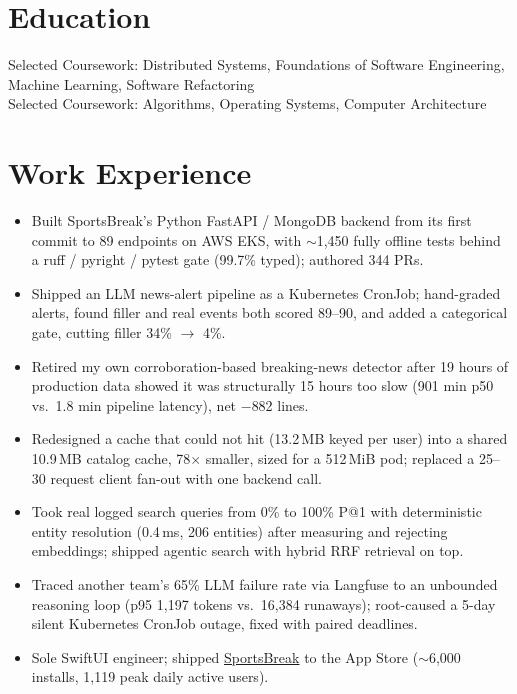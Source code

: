 \documentclass[11pt, letterpaper]{article}
\begin{document}

\section{Education}
Selected Coursework: Distributed Systems, Foundations of Software Engineering, Machine Learning, Software Refactoring\\[1pt]
Selected Coursework: Algorithms, Operating Systems, Computer Architecture

\section{Work Experience}
\begin{itemize}
  \item Built SportsBreak's Python FastAPI / MongoDB backend from its first commit to 89 endpoints on AWS EKS, with $\sim$1{,}450 fully offline tests behind a ruff / pyright / pytest gate (99.7\% typed); authored 344 PRs.
  \item Shipped an LLM news-alert pipeline as a Kubernetes CronJob; hand-graded alerts, found filler and real events both scored 89--90, and added a categorical gate, cutting filler 34\% $\to$ 4\%.
  \item Retired my own corroboration-based breaking-news detector after 19 hours of production data showed it was structurally 15 hours too slow (901 min p50 vs.\ 1.8 min pipeline latency), net $-$882 lines.
  \item Redesigned a cache that could not hit (13.2\,MB keyed per user) into a shared 10.9\,MB catalog cache, 78$\times$ smaller, sized for a 512\,MiB pod; replaced a 25--30 request client fan-out with one backend call.
  \item Took real logged search queries from 0\% to 100\% P@1 with deterministic entity resolution (0.4\,ms, 206 entities) after measuring and rejecting embeddings; shipped agentic search with hybrid RRF retrieval on top.
  \item Traced another team's 65\% LLM failure rate via Langfuse to an unbounded reasoning loop (p95 1{,}197 tokens vs.\ 16{,}384 runaways); root-caused a 5-day silent Kubernetes CronJob outage, fixed with paired deadlines.
  \item Sole SwiftUI engineer; shipped \href{https://apps.apple.com/app/id6762649287}{SportsBreak} to the App Store ($\sim$6{,}000 installs, 1{,}119 peak daily active users).
\end{itemize}
\end{document}

